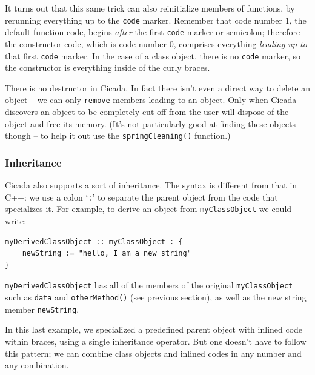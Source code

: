 \documentclass{article}
\newenvironment{code}{
       \begin{list}{}{
               \setlength{\leftmargin}{.4in}
               \setlength{\rightmargin}{0in}
               \setlength{\topsep}{.2in}
       }
       \small
       \item[] }
       { \end{list}   }
\begin{document}
\noindent It turns out that this same trick can also reinitialize members of functions, by rerunning everything up to the \verb#code# marker.  Remember that code number 1, the default function code, begins \emph{after} the first \verb#code# marker or semicolon; therefore the constructor code, which is code number 0, comprises everything \emph{leading up to} that first \verb#code# marker.  In the case of a class object, there is no \verb#code# marker, so the constructor is everything inside of the curly braces.

There is no destructor in Cicada.  In fact there isn't even a direct way to delete an object -- we can only \verb#remove# members leading to an object.  Only when Cicada discovers an object to be completely cut off from the user will dispose of the object and free its memory.  (It's not particularly good at finding these objects though -- to help it out use the \texttt{springCleaning()} function.)








\subsubsection{Inheritance}

Cicada also supports a sort of inheritance.  The syntax is different from that in C++:  we use a colon `\verb#:#' to separate the parent object from the code that specializes it.  For example, to derive an object from \verb#myClassObject# we could write:

\begin{code} \begin{verbatim}
myDerivedClassObject :: myClassObject : {
    newString := "hello, I am a new string"
}
\end{verbatim} \end{code}

\noindent \verb#myDerivedClassObject# has all of the members of the original \verb#myClassObject# such as \verb#data# and \verb#otherMethod()# (see previous section), as well as the new string member \verb#newString#.

In this last example, we specialized a predefined parent object with inlined code within braces, using a single inheritance operator.  But one doesn't have to follow this pattern; we can combine class objects and inlined codes in any number and any combination.
\end{document}
